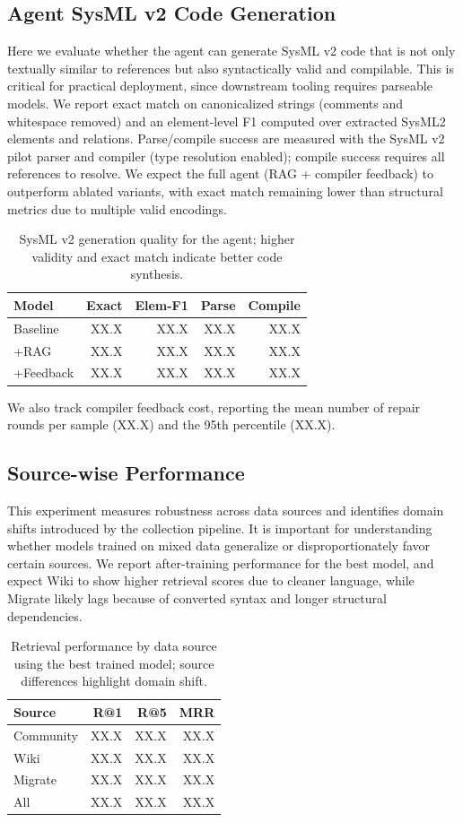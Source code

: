 \documentclass{article}
\begin{document}
\subsection{Agent SysML v2 Code Generation}
Here we evaluate whether the agent can generate SysML v2 code that is not only textually similar to references but also syntactically valid and compilable. This is critical for practical deployment, since downstream tooling requires parseable models. We report exact match on canonicalized strings (comments and whitespace removed) and an element-level F1 computed over extracted SysML2 elements and relations. Parse/compile success are measured with the SysML v2 pilot parser and compiler (type resolution enabled); compile success requires all references to resolve. We expect the full agent (RAG + compiler feedback) to outperform ablated variants, with exact match remaining lower than structural metrics due to multiple valid encodings.
\begin{table}[H]
\centering
\setlength{\tabcolsep}{3pt}
\caption{SysML v2 generation quality for the agent; higher validity and exact match indicate better code synthesis.}
\label{tab:sysml-gen}
\begin{tabular}{lrrrr}
\toprule
Model & Exact & Elem-F1 & Parse & Compile \\
\midrule
Baseline & XX.X & XX.X & XX.X & XX.X \\
+RAG & XX.X & XX.X & XX.X & XX.X \\
+Feedback & XX.X & XX.X & XX.X & XX.X \\
\bottomrule
\end{tabular}
\end{table}
We also track compiler feedback cost, reporting the mean number of repair rounds per sample (XX.X) and the 95th percentile (XX.X).

\subsection{Source-wise Performance}
This experiment measures robustness across data sources and identifies domain shifts introduced by the collection pipeline. It is important for understanding whether models trained on mixed data generalize or disproportionately favor certain sources. We report after-training performance for the best model, and expect Wiki to show higher retrieval scores due to cleaner language, while Migrate likely lags because of converted syntax and longer structural dependencies.
\begin{table}[H]
\centering
\small
\caption{Retrieval performance by data source using the best trained model; source differences highlight domain shift.}
\label{tab:source-wise}
\begin{tabular}{lrrr}
\toprule
Source & R@1 & R@5 & MRR \\
\midrule
Community & XX.X & XX.X & XX.X \\
Wiki & XX.X & XX.X & XX.X \\
Migrate & XX.X & XX.X & XX.X \\
All & XX.X & XX.X & XX.X \\
\bottomrule
\end{tabular}
\end{table}
\end{document}
